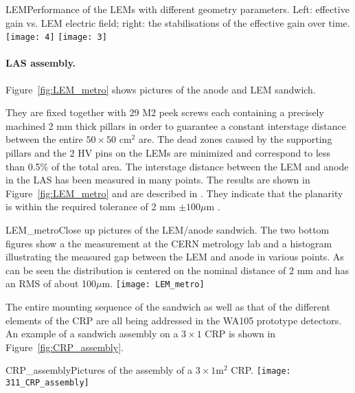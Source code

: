 \begin{cdrfigure}{LEM}{Performance of the LEMs with different geometry
      parameters. Left: effective gain vs. LEM electric field; right:
      the stabilisations of the effective gain over time.}
     \texttt{[image: 4]}
    \texttt{[image: 3]}
\end{cdrfigure}


\paragraph{LAS assembly.}
Figure~\ref{fig:LEM_metro} shows pictures of the anode and LEM sandwich.  

They are fixed together with 29 M2 peek screws each containing a precisely machined 2 mm thick pillars in order to guarantee a  constant interstage distance between the entire $50\times50$ cm$^2$ are.  The dead zones caused by the supporting pillars and the 2 HV  pins on the LEMs are minimized and correspond to less than 0.5\% of the total area. The interstage distance between the LEM and anode in the LAS has been measured  in many points. The results are shown in Figure~\ref{fig:LEM_metro} and are described in \cite{EDMS_metro_lem_anode}. They indicate that the planarity is within the required tolerance of 2 mm $\pm 100 \mu$m .

\begin{cdrfigure}{LEM_metro}{Close up pictures of the LEM/anode sandwich. The two
       bottom figures show a the measurement at the CERN metrology lab
       and a histogram illustrating the measured gap between the LEM
       and anode in various points. As can be seen the distribution is
       centered on the nominal distance of 2 mm and has an RMS of
       about 100$\mu$m.}
     \texttt{[image: LEM\_metro]}
\end{cdrfigure}

The entire mounting sequence of the sandwich as well as that of the different elements of the CRP are all being addressed in the  WA105 prototype detectors. An example of a sandwich assembly on a   $3\times1$ CRP is shown in Figure~\ref{fig:CRP_assembly}.

\begin{cdrfigure}{CRP_assembly}{Pictures of the assembly of a $3\times1$m$^2$ CRP.}
     \texttt{[image: 311\_CRP\_assembly]}  
\end{cdrfigure}